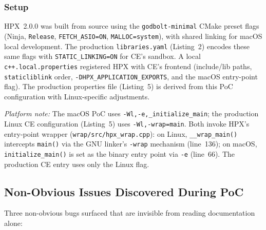 \documentclass[11pt, a4paper]{article}
\newcommand{\code}[1]{\texttt{#1}}
\newcommand{\cefile}[1]{\texttt{#1}}
\begin{document}
\subsubsection*{Setup}

HPX~2.0.0 was built from source using the \code{godbolt-minimal} CMake
preset flags (Ninja, \code{Release}, \code{FETCH\_ASIO=ON},
\code{MALLOC=system}), with shared linking for macOS local development.
The production \code{libraries.yaml} (Listing~2) encodes these same
flags with \code{STATIC\_LINKING=ON} for CE's sandbox.
A local \code{c++.local.properties} registered HPX with CE's frontend
(include/lib paths, \code{staticliblink} order,
\code{-DHPX\_APPLICATION\_EXPORTS}, and the macOS entry-point flag).
The production properties file (Listing~5) is derived from this PoC
configuration with Linux-specific adjustments.

\noindent\textit{Platform note:}
The macOS PoC uses \code{-Wl,-e,\_initialize\_main}; the production Linux
CE configuration (Listing~5) uses \code{-Wl,-wrap=main}.  Both invoke HPX's
entry-point wrapper (\cefile{wrap/src/hpx\_wrap.cpp}): on Linux,
\code{\_\_wrap\_main()} intercepts \code{main()} via the GNU linker's
\code{-wrap} mechanism (line~136); on macOS, \code{initialize\_main()} is
set as the binary entry point via \code{-e} (line~66).  The production CE
entry uses only the Linux flag.

\subsection*{Non-Obvious Issues Discovered During PoC}

Three non-obvious bugs surfaced that are invisible from reading
documentation alone:
\end{document}
